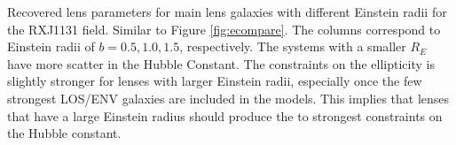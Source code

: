 \label{fig:recompare} Recovered lens parameters for main lens galaxies with different Einstein radii for the RXJ1131 field. Similar to Figure \ref{fig:ecompare}. The columns correspond to Einstein radii of $b = 0.5,1.0,1.5$, respectively. The systems with a smaller $R_E$ have more scatter in the Hubble Constant. The constraints on the ellipticity is slightly stronger for lenses with larger Einstein radii, especially once the few strongest LOS/ENV galaxies are included in the models. This implies that lenses that have a large Einstein radius should produce the to strongest constraints on the Hubble constant.